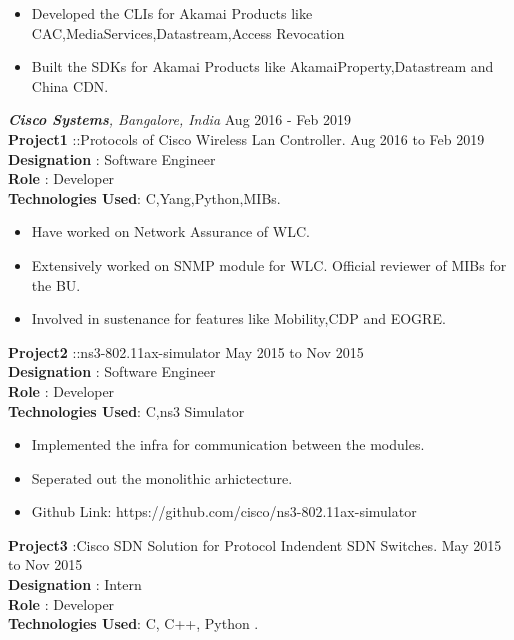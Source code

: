 \documentclass{resumeclass}
\begin{document}
\begin{resume}
   \begin{itemize} \itemsep -2pt
    \item Developed the CLIs for Akamai Products like CAC,MediaServices,Datastream,Access Revocation
    \item Built the SDKs for Akamai Products like AkamaiProperty,Datastream and China CDN.
  \end{itemize} \vspace{-6pt}


{\sl \textbf{Cisco Systems}, Bangalore, India} \hfill        Aug 2016 - Feb 2019 \\[0.5pt]


\textbf{Project1} ::Protocols of Cisco Wireless Lan Controller. \hfill      Aug 2016 to Feb 2019 \\
\textbf{Designation} : Software Engineer \\
\textbf{Role} : Developer \\
\textbf{Technologies Used}: C,Yang,Python,MIBs.

 \begin{itemize} \itemsep -2pt
  \item Have worked on Network Assurance of WLC.
  \item Extensively worked on SNMP module for WLC. Official reviewer of MIBs for the BU.
  \item Involved in sustenance for features like Mobility,CDP and EOGRE.
\end{itemize} \vspace{-6pt}


\textbf{Project2} ::ns3-802.11ax-simulator \hfill      May 2015 to Nov 2015 \\
\textbf{Designation} : Software Engineer \\
\textbf{Role} : Developer \\
\textbf{Technologies Used}: C,ns3 Simulator

 \begin{itemize} \itemsep -2pt
  \item Implemented the infra for communication between the modules.
  \item Seperated out the monolithic arhictecture.
  \item Github Link: https://github.com/cisco/ns3-802.11ax-simulator
\end{itemize} \vspace{-6pt}

\textbf{Project3} :Cisco SDN Solution for Protocol Indendent SDN Switches. \hfill      May 2015 to Nov 2015 \\
\textbf{Designation} : Intern \\
\textbf{Role} : Developer \\
\textbf{Technologies Used}: C, C++, Python .


\end{resume}
\end{document}
